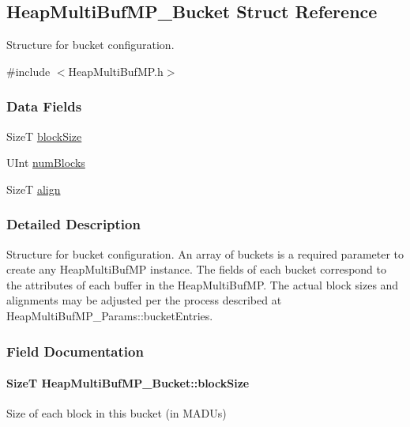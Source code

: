 \subsection{HeapMultiBufMP\_\-Bucket Struct Reference}
\label{struct_heap_multi_buf_m_p___bucket}


Structure for bucket configuration.  




{\ttfamily \#include $<$HeapMultiBufMP.h$>$}

\subsubsection*{Data Fields}
\begin{DoxyCompactItemize}
\item 
SizeT \hyperlink{struct_heap_multi_buf_m_p___bucket_a9da93c2ee9285ee0c68781f1f31d5097}{blockSize}
\item 
UInt \hyperlink{struct_heap_multi_buf_m_p___bucket_aae58960c7220dbf07d8eb41f09083b1c}{numBlocks}
\item 
SizeT \hyperlink{struct_heap_multi_buf_m_p___bucket_a0ca1421d9f65451f797e07811cefd80a}{align}
\end{DoxyCompactItemize}


\subsubsection{Detailed Description}
Structure for bucket configuration. An array of buckets is a required parameter to create any HeapMultiBufMP instance. The fields of each bucket correspond to the attributes of each buffer in the HeapMultiBufMP. The actual block sizes and alignments may be adjusted per the process described at HeapMultiBufMP\_\-Params::bucketEntries. 

\subsubsection{Field Documentation}
\paragraph[{blockSize}]{\setlength{\rightskip}{0pt plus 5cm}SizeT {\bf HeapMultiBufMP\_\-Bucket::blockSize}}\hfill\label{struct_heap_multi_buf_m_p___bucket_a9da93c2ee9285ee0c68781f1f31d5097}
Size of each block in this bucket (in MADUs) 
